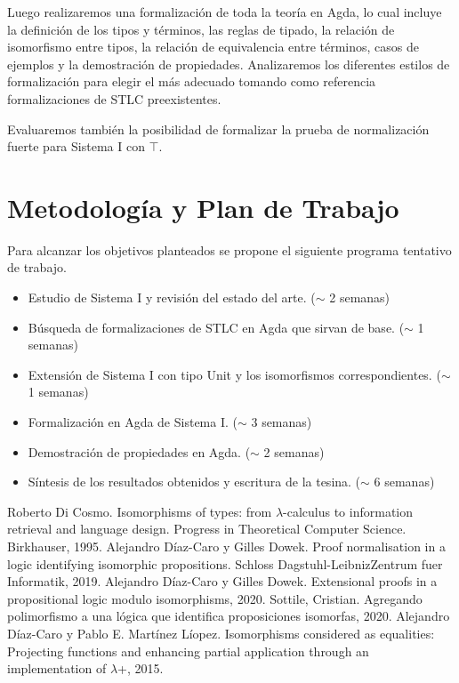 \documentclass[a4paper,10pt]{article}
\begin{document}
Luego realizaremos una formalización de toda la teoría en Agda, lo cual incluye la definición de los tipos y términos, las reglas de tipado, la relación de isomorfismo entre tipos, la relación de equivalencia entre términos, casos de ejemplos y la demostración de propiedades. Analizaremos los diferentes estilos de formalización para elegir el más adecuado tomando como referencia formalizaciones de STLC preexistentes.

Evaluaremos también la posibilidad de formalizar la prueba de normalización fuerte para Sistema I con $\top$.

\section{Metodología y Plan de Trabajo}
Para alcanzar los objetivos planteados se propone el siguiente programa tentativo de trabajo.

\begin{itemize}
 \item Estudio de Sistema I y revisión del estado del arte. ($\sim$ 2 semanas)
 \item Búsqueda de formalizaciones de STLC en Agda que sirvan de base. ($\sim$ 1 semanas)
 \item Extensión de Sistema I con tipo Unit y los isomorfismos correspondientes. ($\sim$ 1 semanas)
 \item Formalización en Agda de Sistema I. ($\sim$ 3 semanas)
 \item Demostración de propiedades en Agda. ($\sim$ 2 semanas)
 \item Síntesis de los resultados obtenidos y escritura de la tesina. ($\sim$ 6 semanas)
\end{itemize}


\begin{thebibliography}{1}
     Roberto Di Cosmo. Isomorphisms of types: from $\lambda$-calculus to information retrieval and language design. Progress in Theoretical Computer Science. Birkhauser, 1995.
    Alejandro Díaz-Caro y Gilles Dowek. Proof normalisation in a logic identifying isomorphic propositions. Schloss Dagstuhl-LeibnizZentrum fuer Informatik, 2019.
    Alejandro Díaz-Caro y Gilles Dowek. Extensional proofs in a propositional logic modulo isomorphisms, 2020.
    Sottile, Cristian. Agregando polimorfismo a una lógica que identifica proposiciones isomorfas, 2020.
    Alejandro Díaz-Caro y Pablo E. Martínez Líopez. Isomorphisms considered as equalities: Projecting functions and enhancing partial application through an implementation of $\lambda$+, 2015.
\end{thebibliography}
\end{document}
